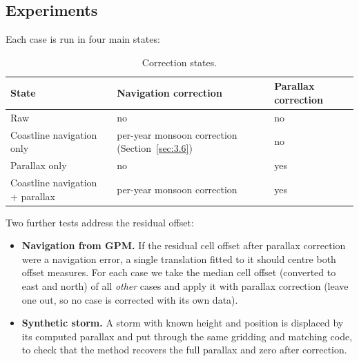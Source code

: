 \subsection{Experiments}\label{sec:4.5}

Each case is run in four main states:

\begin{table}[!t]
\centering
\caption{Correction states.}\label{tab:S}
\footnotesize
\begin{tabular}{@{}
  >{\raggedright\arraybackslash}p{}
  >{\raggedright\arraybackslash}p{}
  >{\raggedright\arraybackslash}p{}@{}}
\toprule
\begin{minipage}[b]{\linewidth}\raggedright
State
\end{minipage} & \begin{minipage}[b]{\linewidth}\raggedright
Navigation correction
\end{minipage} & \begin{minipage}[b]{\linewidth}\raggedright
Parallax correction
\end{minipage} \\
\midrule
Raw & no & no \\
Coastline navigation only & per-year monsoon correction (Section~\ref{sec:3.6}) & no \\
Parallax only & no & yes \\
Coastline navigation + parallax & per-year monsoon correction & yes \\
\bottomrule
\end{tabular}
\end{table}

Two further tests address the residual offset:

\begin{itemize}
\tightlist
\item
  \textbf{Navigation from GPM.} If the residual cell offset after parallax correction were a navigation error, a single translation fitted to it should centre both offset measures. For each case we take the median cell offset (converted to east and north) of all \emph{other} cases and apply it with parallax correction (leave one out, so no case is corrected with its own data).
\item
  \textbf{Synthetic storm.} A storm with known height and position is displaced by its computed parallax and put through the same gridding and matching code, to check that the method recovers the full parallax and zero after correction.
\end{itemize}

